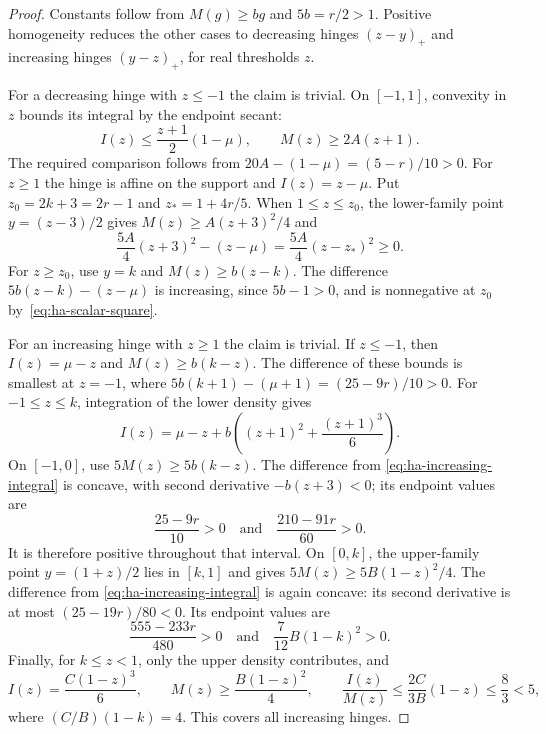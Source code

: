 \begin{proof}
Constants follow from $M(g)\geq bg$ and $5b=r/2>1$.
Positive homogeneity reduces the other cases to decreasing hinges
$(z-y)_+$ and increasing hinges $(y-z)_+$, for real thresholds $z$.

For a decreasing hinge with $z\leq-1$ the claim is trivial. On $[-1,1]$,
convexity in $z$ bounds its integral by the endpoint secant:
\[
 I(z)\leq\frac{z+1}{2}(1-\mu),\qquad M(z)\geq2A(z+1).
\]
The required comparison follows from
$20A-(1-\mu)=(5-r)/10>0$.
For $z\geq1$ the hinge is affine on the support and $I(z)=z-\mu$.
Put $z_0=2k+3=2r-1$ and $z_*=1+4r/5$. When $1\leq z\leq z_0$,
the lower-family point $y=(z-3)/2$ gives $M(z)\geq A(z+3)^2/4$ and
\begin{equation}\label{eq:ha-scalar-square}
 \frac{5A}{4}(z+3)^2-(z-\mu)
       =\frac{5A}{4}(z-z_*)^2\geq0.
\end{equation}
For $z\geq z_0$, use $y=k$ and $M(z)\geq b(z-k)$.
The difference $5b(z-k)-(z-\mu)$ is increasing, since $5b-1>0$,
and is nonnegative at $z_0$ by~\eqref{eq:ha-scalar-square}.

For an increasing hinge with $z\geq1$ the claim is trivial. If $z\leq-1$,
then $I(z)=\mu-z$ and $M(z)\geq b(k-z)$. The difference of these bounds
is smallest at $z=-1$, where
$5b(k+1)-(\mu+1)=(25-9r)/10>0$.
For $-1\leq z\leq k$, integration of the lower density gives
\begin{equation}\label{eq:ha-increasing-integral}
 I(z)=\mu-z+b\left((z+1)^2+\frac{(z+1)^3}{6}\right).
\end{equation}
On $[-1,0]$, use $5M(z)\geq5b(k-z)$. The difference from
\eqref{eq:ha-increasing-integral} is concave, with second derivative
$-b(z+3)<0$; its endpoint values are
\[
 \frac{25-9r}{10}>0\quad\text{and}\quad
 \frac{210-91r}{60}>0.
\]
It is therefore positive throughout that interval.
On $[0,k]$, the upper-family point $y=(1+z)/2$ lies in $[k,1]$ and gives
$5M(z)\geq5B(1-z)^2/4$. The difference from
\eqref{eq:ha-increasing-integral} is again concave: its second derivative
is at most $(25-19r)/80<0$. Its endpoint values are
\[
 \frac{555-233r}{480}>0\quad\text{and}\quad
 \frac7{12}B(1-k)^2>0.
\]
Finally, for $k\leq z<1$, only the upper density contributes, and
\[
 I(z)=\frac{C(1-z)^3}{6},\qquad
 M(z)\geq\frac{B(1-z)^2}{4},\qquad
 \frac{I(z)}{M(z)}\leq\frac{2C}{3B}(1-z)\leq\frac83<5,
\]
where $(C/B)(1-k)=4$. This covers all increasing hinges.
\end{proof}

